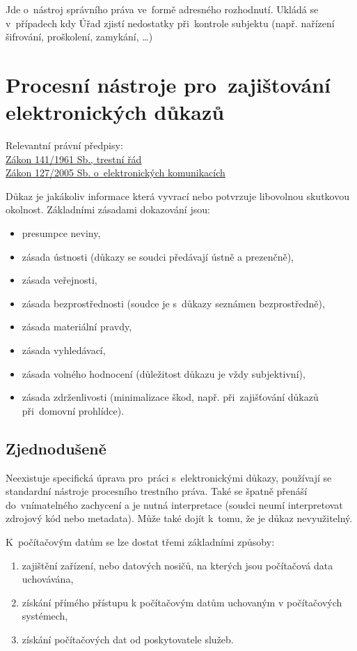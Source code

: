 Jde o~nástroj správního práva ve~formě adresného rozhodnutí.
Ukládá se v~případech kdy Úřad zjistí nedostatky při~kontrole subjektu (např. nařízení šifrování, proškolení, zamykání, \dots)


\clearpage
\section{Procesní nástroje pro~zajištování elektronických důkazů}

{}Relevantní právní předpisy:
\\\href{https://www.zakonyprolidi.cz/cs/1961-141}{Zákon 141/1961 Sb., trestní řád}
\\\href{https://www.zakonyprolidi.cz/cs/2005-127}{Zákon 127/2005 Sb. o~elektronických komunikacích}

Důkaz je jakákoliv informace která vyvrací nebo potvrzuje libovolnou skutkovou okolnost.
Základními zásadami dokazování jsou:
\vspace*{-1em}\begin{itemize}
\item presumpce neviny,
\item zásada ústnosti (důkazy se soudci předávají ústně a prezenčně),
\item zásada veřejnosti,
\item zásada bezprostřednosti (soudce je s~důkazy seznámen bezprostředně),
\item zásada materiální pravdy,
\item zásada vyhledávací,
\item zásada volného hodnocení (důležitost důkazu je vždy subjektivní),
\item zásada zdrženlivosti (minimalizace škod, např. při~zajišťování důkazů při~domovní prohlídce).
\end{itemize}

\subsection{Zjednodušeně}

Neexistuje specifická úprava pro~práci s~elektronickými důkazy, používají se standardní nástroje procesního trestního práva.
Také se špatně přenáší do~vnímatelného zachycení a je nutná interpretace (soudci neumí interpretovat zdrojový kód nebo metadata).
Může také dojít k~tomu, že je důkaz nevyužitelný.

K~počítačovým datům se lze dostat třemi základními způsoby:
\begin{enumerate}[label=\alph*)]
    \item zajištění zařízení, nebo datových nosičů, na kterých jsou počítačová data uchovávána,
    \item získání přímého přístupu k počítačovým datům uchovaným v počítačových systémech,
    \item získání počítačových dat od poskytovatele služeb.
\end{enumerate}

